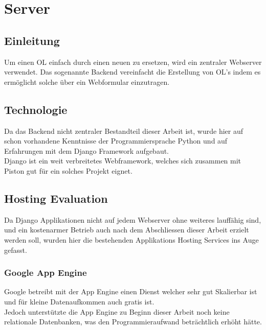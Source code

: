 
\newpage
\section{Server} %
\label{sec:Server}

\subsection{Einleitung} %
\label{sub:Einleitung}
Um einen OL einfach durch einen neuen zu ersetzen, wird ein zentraler Webserver verwendet. Das sogenannte Backend vereinfacht die Erstellung von OL's indem es ermöglicht solche über ein Webformular einzutragen.

\subsection{Technologie} %
\label{sub:Technologie}
Da das Backend nicht zentraler Bestandteil dieser Arbeit ist, wurde hier auf schon vorhandene Kenntnisse der Programmiersprache Python und auf Erfahrungen mit dem Django Framework aufgebaut.\\
Django ist ein weit verbreitetes Webframework, welches sich zusammen mit Piston gut für ein solches Projekt eignet.

\subsection{Hosting Evaluation} %
\label{sub:Hosting Evaluation}
Da Django Applikationen nicht auf jedem Webserver ohne weiteres lauffähig sind, und ein kostenarmer Betrieb auch nach dem Abschliessen dieser Arbeit erzielt werden soll, wurden hier die bestehenden Applikations Hosting Services ins Auge gefasst.

\subsubsection{Google App Engine} %
\label{ssub:Google App Engine}
Google betreibt mit der App Engine einen Dienst welcher sehr gut Skalierbar ist und für kleine Datenaufkommen auch gratis ist.\\
Jedoch unterstützte die App Engine zu Beginn dieser Arbeit noch keine relationale Datenbanken, was den Programmieraufwand beträchtlich erhöht hätte.

